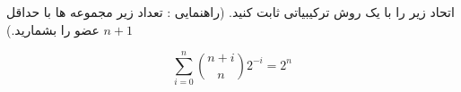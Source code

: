 \exercise
اتحاد زير را با يک روش ترکيبياتی ثابت کنيد. (راهنمايی : تعداد زير مجموعه ها با حداقل 
$n + 1$
عضو را بشمارید.)

$$\sum_{i=0}^{n}\binom{n+i}{n}2^{-i} = 2^n$$